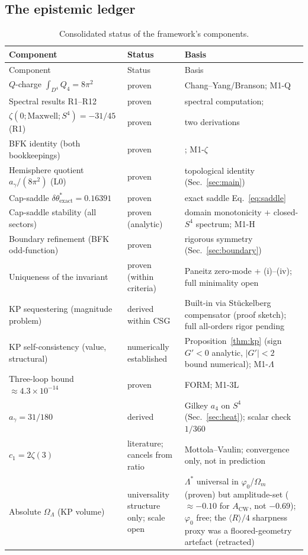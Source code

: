 \documentclass[11pt,a4paper]{article}
\theoremstyle{plain}
\theoremstyle{definition}
\theoremstyle{remark}
\newcommand{\OL}{\Omega_\Lambda}
\newcommand{\ag}{a_\gamma}
\newcommand{\dtheta}{\delta\theta}
\begin{document}
\subsection{The epistemic ledger}
\begin{longtable}{@{}p{6.8cm} l p{4.4cm}@{}}
\caption{Consolidated status of the framework's components.}\label{tab:ledger}\\
\toprule Component & Status & Basis \\ \midrule \endfirsthead
\toprule Component & Status & Basis \\ \midrule \endhead
$Q$-charge $\int_{D^4} Q_4 = 8\pi^2$ & proven & Chang--Yang/Branson; M1-Q \\
Spectral results R1--R12 & proven & spectral computation; \cite{Vassilevich2003} \\
$\zeta(0;\mathrm{Maxwell};S^4) = -31/45$ (R1) & proven & two derivations \\
BFK identity (both bookkeepings) & proven & \cite{BFK1992}; M1-$\zeta$ \\
Hemisphere quotient $\ag/(8\pi^2)$ (L0) & proven & topological identity (Sec.~\ref{sec:main}) \\
Cap-saddle $\dtheta^*_{\mathrm{exact}} = 0.16391$ & proven & exact saddle Eq.~\eqref{eq:saddle} \\
Cap-saddle stability (all sectors) & proven (analytic) & domain monotonicity + closed-$S^4$ spectrum; M1-H \\
Boundary refinement (BFK odd-function) & proven & rigorous symmetry (Sec.~\ref{sec:boundary}) \\
Uniqueness of the invariant & proven (within criteria) & Paneitz zero-mode + (i)--(iv); full minimality open \\
KP sequestering (magnitude problem) & derived within CSG & Built-in via St\"uckelberg compensator (proof sketch); full all-orders rigor pending \\
KP self-consistency (value, structural) & numerically established & Proposition~\ref{thm:kp} (sign $G'<0$ analytic, $|G'|<2$ bound numerical); M1-$\Lambda$ \\
Three-loop bound $\approx 4.3\times 10^{-14}$ & proven & FORM; M1-3L \\
$\ag = 31/180$ & derived & Gilkey $a_4$ on $S^4$ (Sec.~\ref{sec:heat}); scalar check $1/360$ \\
$c_1 = 2\zeta(3)$ & literature; cancels from ratio & Mottola--Vaulin; convergence only, not in prediction \\
Absolute $\OL$ (KP volume) & universality structure only; scale open & $\Lambda^*$ universal in $\varphi_0$/$\Omega_m$ (proven) but amplitude-set ($\approx-0.10$ for $A_{\mathrm{CW}}$, not $-0.69$); $\varphi_0$ free; the $\langle R\rangle/4$ sharpness proxy was a floored-geometry artefact (retracted) \\

\end{longtable}
\end{document}
